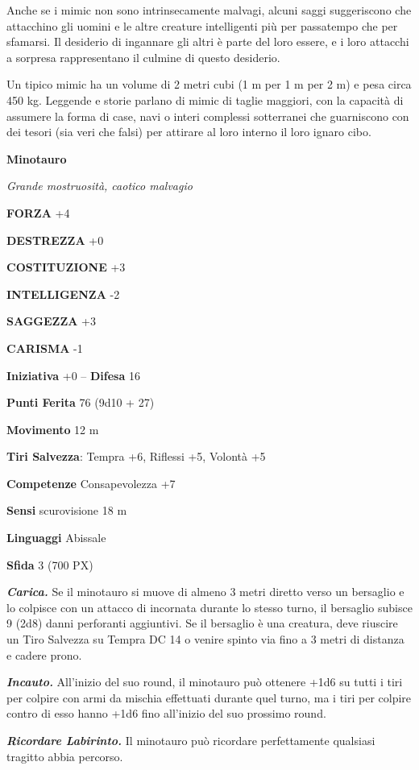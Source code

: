 \begin{multicols}{2}
Anche se i mimic non sono intrinsecamente malvagi, alcuni saggi suggeriscono che attacchino gli uomini e le altre creature intelligenti più per passatempo che per sfamarsi. Il desiderio di ingannare gli altri è parte del loro essere, e i loro attacchi a sorpresa rappresentano il culmine di questo desiderio.

Un tipico mimic ha un volume di 2 metri cubi (1 m per 1 m per 2 m) e pesa circa 450 kg. Leggende e storie parlano di mimic di taglie maggiori, con la capacità di assumere la forma di case, navi o interi complessi sotterranei che guarniscono con dei tesori (sia veri che falsi) per attirare al loro interno il loro ignaro cibo.


\medskip{}\textbf{Minotauro}

\textit{Grande mostruosità, caotico malvagio}

\textbf{FORZA} +4

\textbf{DESTREZZA} +0

\textbf{COSTITUZIONE} +3

\textbf{INTELLIGENZA} -2

\textbf{SAGGEZZA} +3

\textbf{CARISMA} -1

\textbf{Iniziativa} +0 -- \textbf{Difesa} 16

\textbf{Punti Ferita} 76 (9d10 + 27)

\textbf{Movimento} 12 m

\textbf{Tiri Salvezza}: Tempra +6, Riflessi +5, Volontà +5

\textbf{Competenze} Consapevolezza +7

\textbf{Sensi} scurovisione 18 m

\textbf{Linguaggi} Abissale

\textbf{Sfida} 3 (700 PX)

\textit{\textbf{Carica.}} Se il minotauro si muove di almeno 3 metri diretto verso un bersaglio e lo colpisce con un attacco di incornata durante lo stesso turno, il bersaglio subisce 9 (2d8) danni perforanti aggiuntivi. Se il bersaglio è una creatura, deve riuscire un Tiro Salvezza su Tempra DC 14 o venire spinto via fino a 3 metri di distanza e cadere prono.

\textit{\textbf{Incauto.}} All'inizio del suo round, il minotauro può ottenere +1d6 su tutti i tiri per colpire con armi da mischia effettuati durante quel turno, ma i tiri per colpire contro di esso hanno +1d6 fino all'inizio del suo prossimo round.

\textit{\textbf{Ricordare Labirinto.}} Il minotauro può ricordare perfettamente qualsiasi tragitto abbia percorso.


\end{multicols}
